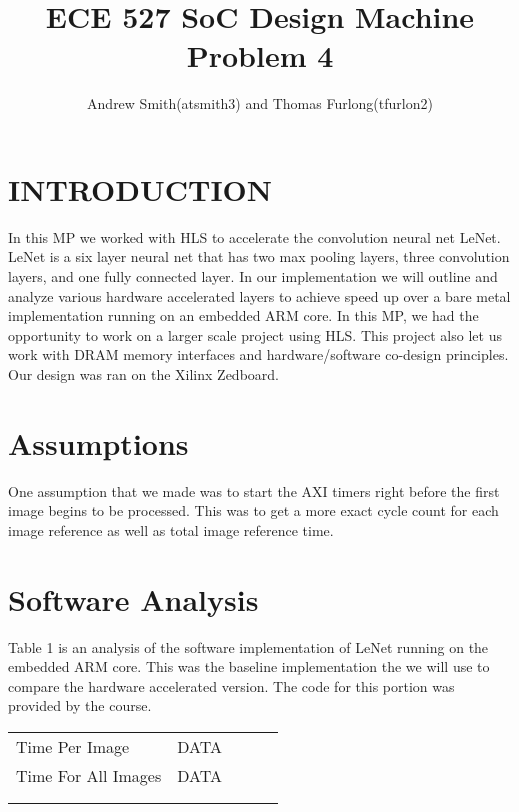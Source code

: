 \documentclass[letterpaper, 10 pt, conference]{IEEEconf}  %
\title{\LARGE \bf ECE 527 SoC Design Machine Problem 4}
\author{Andrew Smith(atsmith3) and Thomas Furlong(tfurlon2)}%
\begin{document}
\maketitle
\thispagestyle{empty}
\pagestyle{empty}


\section{INTRODUCTION}
In this MP we worked with HLS to accelerate the convolution neural net LeNet. LeNet is a six layer neural net that has two max pooling layers, three convolution layers, and one fully connected layer. In our implementation we will outline and analyze various hardware accelerated layers to achieve speed up over a bare metal implementation running on an embedded ARM core. In this MP, we had the opportunity to work on a larger scale project using HLS. This project also let us work with DRAM memory interfaces and hardware/software co-design principles. Our design was ran on the Xilinx Zedboard. 


\section{Assumptions}
One assumption that we made was to start the AXI timers right before the first image begins to be processed. This was to get a more exact cycle count for each image reference as well as total image reference time. 

\section{Software Analysis}
Table 1 is an analysis of the software implementation of LeNet running on the embedded ARM core. This was the baseline implementation the we will use to compare the hardware accelerated version. The code for this portion was provided by the course. 

\begin{table}[H]
\begin{center}
\begin{tabular}{lllll}
\cline{1-2}
\multicolumn{1}{|l|}{Time Per Image}      & \multicolumn{1}{l|}{DATA} &  &  &  \\ \cline{1-2}
\multicolumn{1}{|l|}{Time For All Images} & \multicolumn{1}{l|}{DATA} &  &  &  \\ \cline{1-2}
                                          &                       &  &  &  \\
                                          &                       &  &  & 
\end{tabular}
\end{center}
\end{table}
\end{document}
